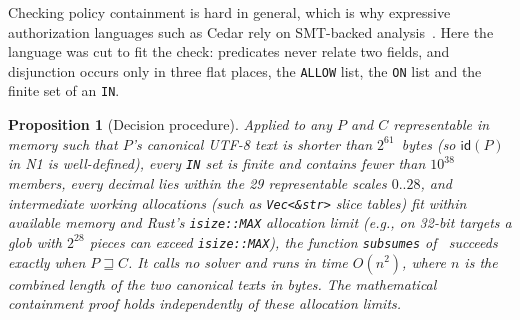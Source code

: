 \documentclass[10pt,twocolumn]{article}
\theoremstyle{plain}
\newtheorem{proposition}[theorem]{Proposition}
\theoremstyle{definition}
\newcommand{\covers}{\sqsupseteq}
\begin{document}
Checking policy containment is hard in general, which is why expressive authorization languages such as Cedar rely on SMT-backed analysis~\cite{cutler2024cedar}. Here the language was cut to fit the check: predicates never relate two fields, and disjunction occurs only in three flat places, the \texttt{ALLOW} list, the \texttt{ON} list and the finite set of an \texttt{IN}.

\begin{proposition}[Decision procedure]
\label{prop:decide}
Applied to any $P$ and $C$ representable in memory such that $P$'s canonical UTF-8 text is shorter than $2^{61}$~bytes (so $\mathsf{id}(P)$ in N1 is well-defined), every \texttt{IN} set is finite and contains fewer than $10^{38}$ members, every decimal lies within the 29 representable scales $0..28$, and intermediate working allocations (such as \texttt{Vec<\&str>} slice tables) fit within available memory and Rust's \texttt{isize::MAX} allocation limit (e.g., on 32-bit targets a glob with $2^{28}$ pieces can exceed \texttt{isize::MAX}), the function \texttt{subsumes} of~ succeeds exactly when $P \covers C$. It calls no solver and runs in time $O(n^2)$, where $n$ is the combined length of the two canonical texts in bytes. The mathematical containment proof holds independently of these allocation limits.
\end{proposition}
\end{document}

